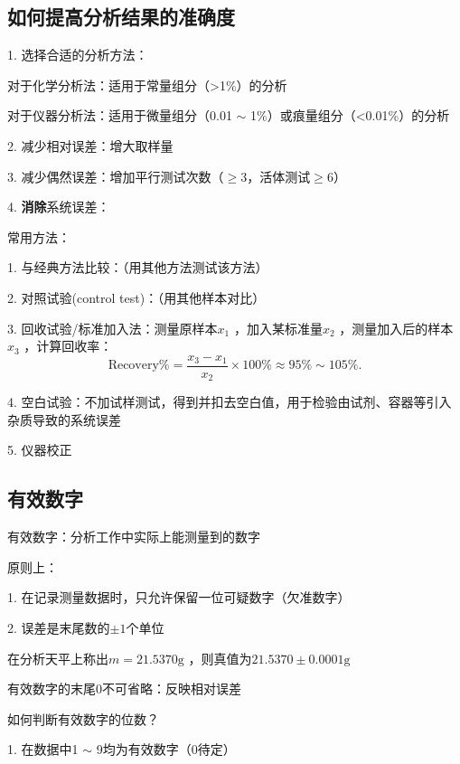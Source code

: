 \subsection{如何提高分析结果的准确度}%
\label{sub:如何提高分析结果的准确度}
1. 选择合适的分析方法：
\begin{notation}
    对于化学分析法：适用于常量组分（>1\%）的分析

    对于仪器分析法：适用于微量组分（0.01 $\sim $ 1\%）或痕量组分（<0.01\%）的分析
\end{notation}

2. 减少相对误差：增大取样量

3. 减少偶然误差：增加平行测试次数（$\ge 3$，活体测试$\ge 6$）

4. \textbf{消除}系统误差：
\begin{notation}
    常用方法：

    1. 与经典方法比较：（用其他方法测试该方法）

    2. 对照试验(control test)：（用其他样本对比）

    3. 回收试验/标准加入法：测量原样本$x_1$ ，加入某标准量$x_2$ ，测量加入后的样本$x_3$ ，计算回收率：\[
        \text{Recovery}\%=\frac{x_3-x_1}{x_2}\times 100\%\approx 95\%\sim 105\%
    .\] 

    4. 空白试验：不加试样测试，得到并扣去空白值，用于检验由试剂、容器等引入杂质导致的系统误差

    5. 仪器校正
\end{notation}

\subsection{有效数字}%
\label{sub:有效数字}
\begin{defi}
    有效数字：分析工作中实际上能测量到的数字
\end{defi}
原则上：

1. 在记录测量数据时，只允许保留一位可疑数字（欠准数字）

2. 误差是末尾数的$\pm 1$个单位
\begin{eg}
    在分析天平上称出$m=21.5370\text{g}$ ，则真值为$21.5370\pm 0.0001\text{g}$
\end{eg}
\begin{notation}
    有效数字的末尾0不可省略：反映相对误差
\end{notation}

\begin{question}
    如何判断有效数字的位数？
\end{question}
1. 在数据中1 $\sim $ 9均为有效数字（0待定）

